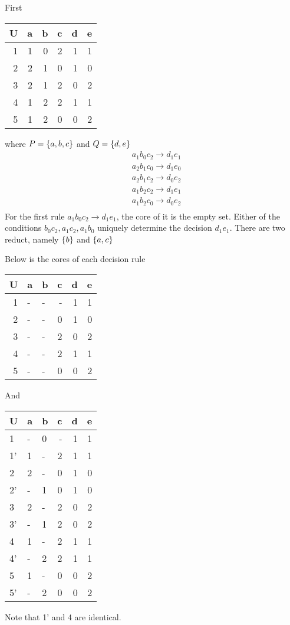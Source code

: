\documentclass[11pt]{article}
\begin{document}
First
\begin{center}
\begin{tabular}{rrrrrr}
U & a & b & c & d & e\\
\hline
1 & 1 & 0 & 2 & 1 & 1\\
2 & 2 & 1 & 0 & 1 & 0\\
3 & 2 & 1 & 2 & 0 & 2\\
4 & 1 & 2 & 2 & 1 & 1\\
5 & 1 & 2 & 0 & 0 & 2\\
\end{tabular}
\end{center}
where \(P=\left\{ a,b,c\right\}\) and \(Q=\left\{ d,e\right\}\)
\begin{align*}
   &a_1b_0c_2\to d_1e_1\\
   &a_2b_1c_0\to d_1e_0\\
   &a_2b_1c_2\to d_0e_2\\
   &a_1b_2c_2\to d_1e_1\\
   &a_1b_2c_0\to d_0e_2\\
 \end{align*}
For the first rule \(a_1b_0c_2\to d_1e_1\), the core of it is the empty set.
Either of the conditions \(b_0c_2,a_1c_2,a_1b_0\) uniquely determine the
decision \(d_1e_1\). There are two reduct, namely \(\left\{ b\right\}\) and \(\left\{ a,c\right\}\)

Below is the cores of each decision rule
\begin{center}
\begin{tabular}{rllrrr}
U & a & b & c & d & e\\
\hline
1 & - & - & - & 1 & 1\\
2 & - & - & 0 & 1 & 0\\
3 & - & - & 2 & 0 & 2\\
4 & - & - & 2 & 1 & 1\\
5 & - & - & 0 & 0 & 2\\
\end{tabular}
\end{center}
And
\begin{center}
\begin{tabular}{lllrrr}
U & a & b & c & d & e\\
\hline
1 & - & 0 & - & 1 & 1\\
1' & 1 & - & 2 & 1 & 1\\
\hline
2 & 2 & - & 0 & 1 & 0\\
2' & - & 1 & 0 & 1 & 0\\
\hline
3 & 2 & - & 2 & 0 & 2\\
3' & - & 1 & 2 & 0 & 2\\
\hline
4 & 1 & - & 2 & 1 & 1\\
4' & - & 2 & 2 & 1 & 1\\
\hline
5 & 1 & - & 0 & 0 & 2\\
5' & - & 2 & 0 & 0 & 2\\
\end{tabular}
\end{center}
Note that 1' and 4 are identical.
\end{document}
